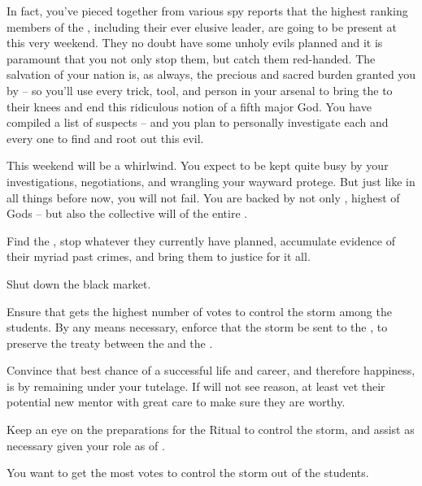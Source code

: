 \documentclass[char]{GL2020}
\begin{document}
In fact, you’ve pieced together from various spy reports that the highest ranking members of the \pGoaties{}, including their ever elusive leader, are going to be present at \pSchool{} this very weekend. They no doubt have some unholy evils planned and it is paramount that you not only stop them, but catch them red-handed. The salvation of your nation is, as always, the precious and sacred burden granted you by \cTechGod{} -- so you’ll use every trick, tool, and person in your arsenal to bring the \pGoaties{} to their knees and end this ridiculous notion of a fifth major God. You have compiled a list of suspects -- and you plan to personally investigate each and every one to find and root out this evil.

This weekend will be a whirlwind. You expect to be kept quite busy by your investigations, negotiations, and wrangling your wayward protege. But just like in all things before now, you will not fail. You are backed by not only \cTechGod{}, highest of Gods -- but also the collective will of the entire \pTech{}.

\begin{itemz}[Goals]
	\item Find the \pGoaties{}, stop whatever they currently have planned, accumulate evidence of their myriad past crimes, and bring them to justice for it all.
	\item Shut down the black market.
\item Ensure that \cScholarship{} gets the highest number of votes to control the storm among the \pTech{} students. By any means necessary, enforce that the storm be sent to the \pShip{}, to preserve the treaty between the \pFarm{} and the \pTech{}.
	\item Convince \cScholarship{} that \cScholarship{\their} best chance of a successful life and career, and therefore happiness, is by remaining under your tutelage. If \cScholarship{\They} will not see reason, at least vet their potential new mentor with great care to make sure they are worthy.
	\item Keep an eye on the preparations for the Ritual to control the storm, and assist as necessary given your role as \cAntiChup{\cleric} of \cTechGod{}.
\end{itemz}

\begin{itemz}[Notes]
	\item You want \cScholarship{} to get the most votes to control the storm out of the \pTech{} students.
\end{itemz}
\end{document}
